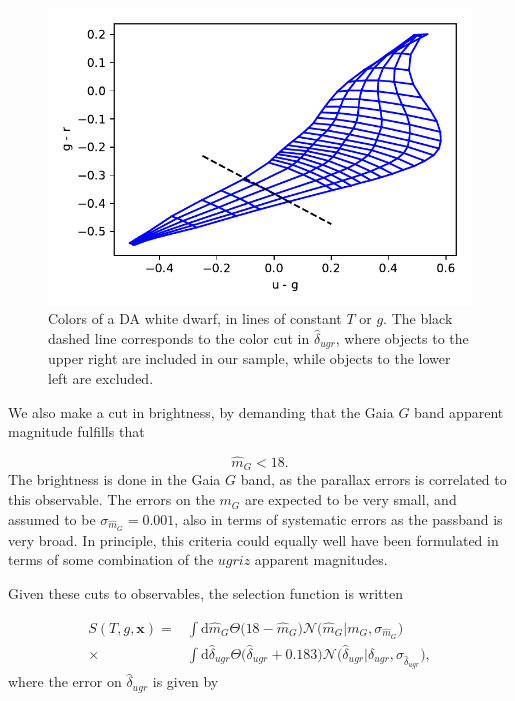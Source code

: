 \documentclass[fleqn,usenatbib]{mnras}
\newcommand{\Teff}{T}
\newcommand{\logg}{g}
\newcommand{\de}{\text{d}}
\begin{document}
\begin{figure}
	\includegraphics[width=\columnwidth]{colors_cut.pdf}
    \caption{Colors of a DA white dwarf, in lines of constant $\Teff$ or $\logg$. The black dashed line corresponds to the color cut in $\hat{\delta}_{ugr}$, where objects to the upper right are included in our sample, while objects to the lower left are excluded.}
    \label{fig:colors_cut}
\end{figure}

We also make a cut in brightness, by demanding that the Gaia $G$ band apparent magnitude fulfills that

\begin{equation}
	\hat{m}_G < 18.
\end{equation}
The brightness is done in the Gaia $G$ band, as the parallax errors is correlated to this observable. The errors on the $m_G$ are expected to be very small, and assumed to be $\sigma_{\hat{m}_G}=0.001$, also in terms of systematic errors as the passband is very broad. In principle, this criteria could equally well have been formulated in terms of some combination of the $ugriz$ apparent magnitudes.

Given these cuts to observables, the selection function is written

\begin{equation}\label{eq:selection}
\begin{split}
	S(\Teff,\logg,\mathbf{x}) = 
    	      & \int \de \hat{m}_G \Theta \big( 18-\hat{m}_G \big)\mathcal{N}\big( \hat{m}_G | m_G,\sigma_{\hat{m}_G} \big) \\
    \times & \int \de \hat{\delta}_{ugr} \Theta \big( \hat{\delta}_{ugr}+0.183 \big) \mathcal{N}\big( \hat{\delta}_{ugr} | \delta_{ugr},\sigma_{\hat{\delta}_{ugr}}\big),
\end{split}
\end{equation}
where the error on $\hat{\delta}_{ugr}$ is given by
\end{document}
